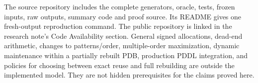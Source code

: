 The source repository includes the complete generators, oracle, tests, frozen inputs, raw outputs, summary code and proof source. Its README gives one fresh-output reproduction command. The public repository is linked in the research note's Code Availability section. General signed allocations, dead-end arithmetic, changes to patterns/order, multiple-order maximization, dynamic maintenance within a partially rebuilt PDB, production PDDL integration, and policies for choosing between exact reuse and full rebuilding are outside the implemented model. They are not hidden prerequisites for the claims proved here.

